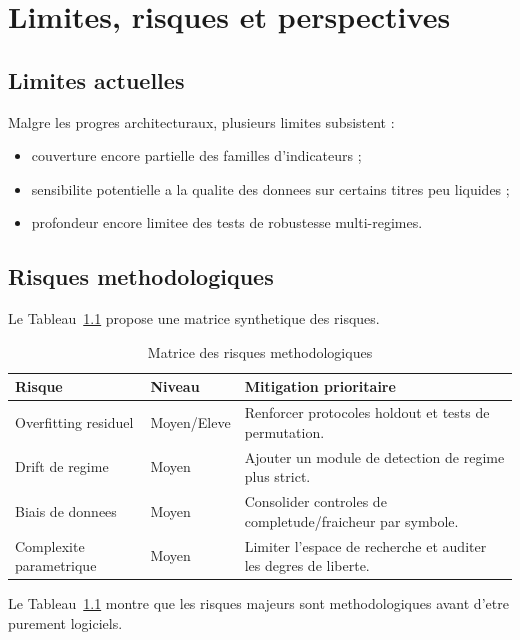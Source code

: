 \chapter{Limites, risques et perspectives}

\section{Limites actuelles}
Malgre les progres architecturaux, plusieurs limites subsistent :
\begin{itemize}
\item couverture encore partielle des familles d'indicateurs ;
\item sensibilite potentielle a la qualite des donnees sur certains titres peu liquides ;
\item profondeur encore limitee des tests de robustesse multi-regimes.
\end{itemize}

\section{Risques methodologiques}
Le Tableau~\ref{tab:risk-matrix} propose une matrice synthetique des risques.

\begin{table}[H]
\centering
\caption{Matrice des risques methodologiques}
\label{tab:risk-matrix}
\begin{tabular}{p{4.2cm}p{3cm}p{6.3cm}}
\toprule
\textbf{Risque} & \textbf{Niveau} & \textbf{Mitigation prioritaire} \\
\midrule
Overfitting residuel & Moyen/Eleve & Renforcer protocoles holdout et tests de permutation. \\
Drift de regime & Moyen & Ajouter un module de detection de regime plus strict. \\
Biais de donnees & Moyen & Consolider controles de completude/fraicheur par symbole. \\
Complexite parametrique & Moyen & Limiter l'espace de recherche et auditer les degres de liberte. \\
\bottomrule
\end{tabular}
\end{table}

Le Tableau~\ref{tab:risk-matrix} montre que les risques majeurs sont
methodologiques avant d'etre purement logiciels.

